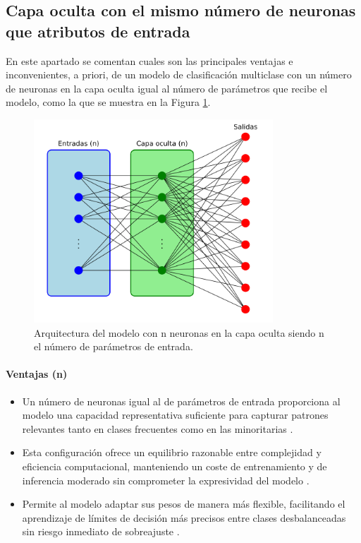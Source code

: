 \subsection{Capa oculta con el mismo número de neuronas que atributos de entrada}\label{sec:VIMUL49}
En este apartado se comentan cuales son las principales ventajas e inconvenientes, a priori, de un modelo de clasificación multiclase con un número de neuronas en la capa oculta igual al número de parámetros que recibe el modelo, como la que se muestra en la Figura \ref{fig:arqnMUL}.

\begin{figure}[H]
    \centering
    \includegraphics[width=0.8\textwidth]{./img/modelo/arquitecturas/arqnMUL.pdf}
    \caption{Arquitectura del modelo con n neuronas en la capa oculta siendo n el número de parámetros de entrada.}
    \label{fig:arqnMUL}
\end{figure}

\paragraph{Ventajas (n)}
\begin{itemize}
	\item Un número de neuronas igual al de parámetros de entrada proporciona al modelo una capacidad representativa suficiente para capturar patrones relevantes tanto en clases frecuentes como en las minoritarias \cite{heaton2017deep}.
	\item Esta configuración ofrece un equilibrio razonable entre complejidad y eficiencia computacional, manteniendo un coste de entrenamiento y de inferencia moderado sin comprometer la expresividad del modelo \cite{goodfellow2016deep}.
	\item Permite al modelo adaptar sus pesos de manera más flexible, facilitando el aprendizaje de límites de decisión más precisos entre clases desbalanceadas sin riesgo inmediato de sobreajuste \cite{he2009learning}.

\end{itemize}
